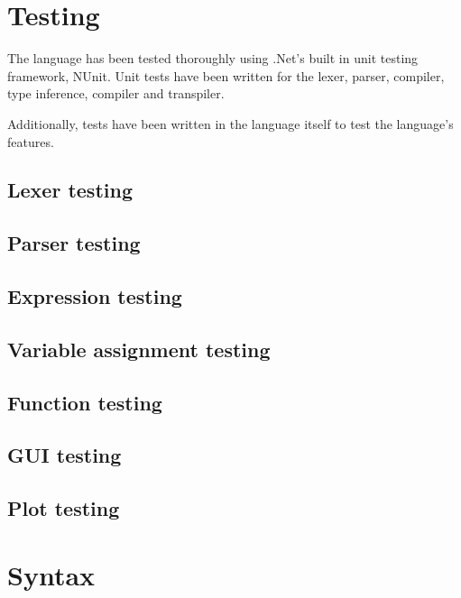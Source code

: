 \documentclass[a4paper, oneside, 11pt]{report}
\begin{document}
\chapter{Testing}\label{ch:test}

The language has been tested thoroughly using .Net's built in unit testing framework, NUnit.
Unit tests have been written for the lexer, parser, compiler, type inference, compiler and transpiler.

Additionally, tests have been written in the language itself to test the language's features.

\section{Lexer testing}\label{sec:lexer-testing}

\section{Parser testing}\label{sec:parser-testing}

\section{Expression testing}\label{sec:arithmetic-expression-testing}

\section{Variable assignment testing}\label{sec:variable-assignment-testing}

\section{Function testing}\label{sec:function-testing}

\section{GUI testing}\label{sec:gui-testing}

\section{Plot testing}\label{sec:plot-testing}

\chapter{Syntax}\label{ch:other-stuff}
\end{document}
